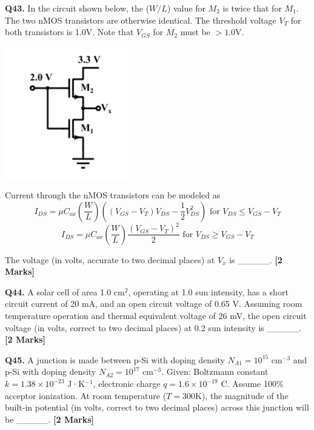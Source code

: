 \documentclass[11pt]{article}
\newcommand{\questionb}[2]{
    \noindent\textbf{Q#2.} #1 \hfill \textbf{[2 Marks]}
}
\begin{document}
\questionb{In the circuit shown below, the ($W/L$) value for $M_2$ is twice that for $M_1$. The two nMOS transistors are otherwise identical. The threshold voltage $V_T$ for both transistors is 1.0V. Note that $V_{GS}$ for $M_2$ must be $> 1.0$V.

\begin{center}
\includegraphics[width=0.4\textwidth]{figures/43.png}
\end{center}

Current through the nMOS transistors can be modeled as
\[
I_{DS} = \mu C_{ox} \left( \frac{W}{L} \right) \left( (V_{GS} - V_T)V_{DS} - \frac{1}{2}V_{DS}^2 \right) \text{ for } V_{DS} \leq V_{GS} - V_T
\]
\[
I_{DS} = \mu C_{ox} \left( \frac{W}{L} \right) \frac{(V_{GS} - V_T)^2}{2} \text{ for } V_{DS} \geq V_{GS} - V_T
\]

The voltage (in volts, accurate to two decimal places) at $V_x$ is \_\_\_\_\_.}{43}

\vspace{0.5cm}

\questionb{A solar cell of area 1.0 cm$^2$, operating at 1.0 sun intensity, has a short circuit current of 20 mA, and an open circuit voltage of 0.65 V. Assuming room temperature operation and thermal equivalent voltage of 26 mV, the open circuit voltage (in volts, correct to two decimal places) at 0.2 sun intensity is \_\_\_\_\_.}{44}

\vspace{0.5cm}

\questionb{A junction is made between p-Si with doping density $N_{A1} = 10^{15}$ cm$^{-3}$ and p-Si with doping density $N_{A2} = 10^{17}$ cm$^{-3}$. Given: Boltzmann constant $k = 1.38 \times 10^{-23}$ J·K$^{-1}$, electronic charge $q = 1.6 \times 10^{-19}$ C. Assume 100\% acceptor ionization. At room temperature ($T = 300$K), the magnitude of the built-in potential (in volts, correct to two decimal places) across this junction will be \_\_\_\_\_.}{45}
\end{document}
